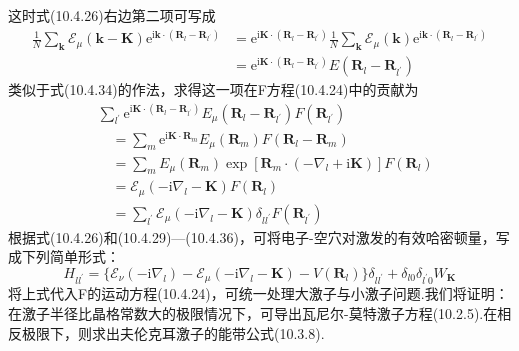 这时式(10.4.26)右边第二项可写成
\begin{equation}
\begin{aligned}
  \frac{1}{N}\sum_{\boldsymbol{k}}\mathscr{E}_{\mu}(\boldsymbol{k}-\boldsymbol{K})
  \mathrm{e}^{\mathrm{i}\boldsymbol{k}\cdot(\boldsymbol{R}_{l}-\boldsymbol{R}_{l^{\prime}})}
  &=\mathrm{e}^{\mathrm{i}\boldsymbol{K}\cdot(\boldsymbol{R}_{l}-\boldsymbol{R}_{l^{\prime}})}
  \frac{1}{N}\sum_{\boldsymbol{k}}\mathscr{E}_{\mu}(\boldsymbol{k})
  \mathrm{e}^{\mathrm{i}\boldsymbol{k}\cdot(\boldsymbol{R}_{l}-\boldsymbol{R}_{l^{\prime}})}\\
  &=\mathrm{e}^{\mathrm{i}\boldsymbol{K}\cdot(\boldsymbol{R}_{l}-\boldsymbol{R}_{l^{\prime}})}
  E(\boldsymbol{R}_{l}-\boldsymbol{R}_{l^{\prime}})
\end{aligned}
\end{equation}
类似于式(10.4.34)的作法，求得这一项在F方程(10.4.24)中的贡献为
\begin{equation}
\begin{aligned}
  &\sum_{l^{\prime}}\mathrm{e}^{\mathrm{i}\boldsymbol{K}\cdot(\boldsymbol{R}_{l}-\boldsymbol{R}_{l^{\prime}})}
  E_{\mu}(\boldsymbol{R}_{l}-\boldsymbol{R}_{l^{\prime}})F(\boldsymbol{R}_{l^{\prime}})\\
  &\quad=\sum_{m}\mathrm{e}^{\mathrm{i}\boldsymbol{K}\cdot\boldsymbol{R}_{m}}
  E_{\mu}(\boldsymbol{R}_{m})F(\boldsymbol{R}_{l}-\boldsymbol{R}_{m})\\
  &\quad=\sum_{m}E_{\mu}(\boldsymbol{R}_{m})
  \exp[\boldsymbol{R}_{m}\cdot(-\nabla_{l}+\mathrm{i}\boldsymbol{K})]F(\boldsymbol{R}_{l})\\
  &\quad=\mathscr{E}_{\mu}(-\mathrm{i}\nabla_{l}-\boldsymbol{K})F(\boldsymbol{R}_{l})\\
  &\quad=\sum_{l^{\prime}}\mathscr{E}_{\mu}(-\mathrm{i}\nabla_{l}-\boldsymbol{K})\delta_{ll^{\prime}}F(\boldsymbol{R}_{l^{\prime}})
\end{aligned}
\end{equation}
根据式(10.4.26)和(10.4.29)—(10.4.36)，可将电子-空穴对激发的有效哈密顿量，写成下列简单形式：
\begin{equation}
  H_{ll^{\prime}}=\{\mathscr{E}_{\nu}(-\mathrm{i}\nabla_{l})
  -\mathscr{E}_{\mu}(-\mathrm{i}\nabla_{l}-\boldsymbol{K})-V(\boldsymbol{R}_{l})\}\delta_{ll^{\prime}}
  +\delta_{l0}\delta_{l^{\prime}0}W_{\boldsymbol{K}}
\end{equation}
将上式代入F的运动方程(10.4.24)，可统一处理大激子与小激子问题.我们将证明：在激子半径比晶格常数大的极限情况下，可导出瓦尼尔-莫特激子方程(10.2.5).在相反极限下，则求出夫伦克耳激子的能带公式(10.3.8).

